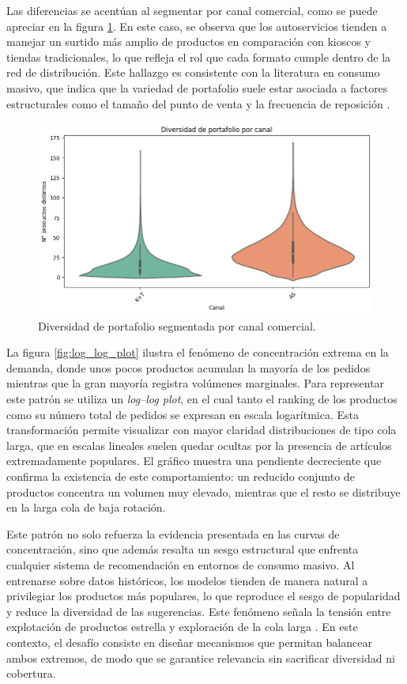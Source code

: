 Las diferencias se acentúan al segmentar por canal comercial, como se puede apreciar en la figura \ref{fig:boxplot_diversidad}. En este caso, se observa que los autoservicios tienden a manejar un surtido más amplio de productos en comparación con kioscos y tiendas tradicionales, lo que refleja el rol que cada formato cumple dentro de la red de distribución. Este hallazgo es consistente con la literatura en consumo masivo, que indica que la variedad de portafolio suele estar asociada a factores estructurales como el tamaño del punto de venta y la frecuencia de reposición \cite{BOOK:Kotler2017}.

\begin{figure}[htpb]
	\centering
	\includegraphics[scale=.55]{./Figures/boxplot_diversidad_canal.png}
	\caption{Diversidad de portafolio segmentada por canal comercial.}
	\label{fig:boxplot_diversidad}
\end{figure}

La figura \ref{fig:log_log_plot} ilustra el fenómeno de concentración extrema en la demanda, donde unos pocos productos acumulan la mayoría de los pedidos mientras que la gran mayoría registra volúmenes marginales. Para representar este patrón se utiliza un \textit{log–log plot}, en el cual tanto el ranking de los productos como su número total de pedidos se expresan en escala logarítmica. Esta transformación permite visualizar con mayor claridad distribuciones de tipo cola larga, que en escalas lineales suelen quedar ocultas por la presencia de artículos extremadamente populares. El gráfico muestra una pendiente decreciente que confirma la existencia de este comportamiento: un reducido conjunto de productos concentra un volumen muy elevado, mientras que el resto se distribuye en la larga cola de baja rotación.

Este patrón no solo refuerza la evidencia presentada en las curvas de concentración, sino que además resalta un sesgo estructural que enfrenta cualquier sistema de recomendación en entornos de consumo masivo. Al entrenarse sobre datos históricos, los modelos tienden de manera natural a privilegiar los productos más populares, lo que reproduce el sesgo de popularidad y reduce la diversidad de las sugerencias. Este fenómeno señala la tensión entre explotación de productos estrella y exploración de la cola larga \cite{BOOK:Celma2010}. En este contexto, el desafío consiste en diseñar mecanismos que permitan balancear ambos extremos, de modo que se garantice relevancia sin sacrificar diversidad ni cobertura.

